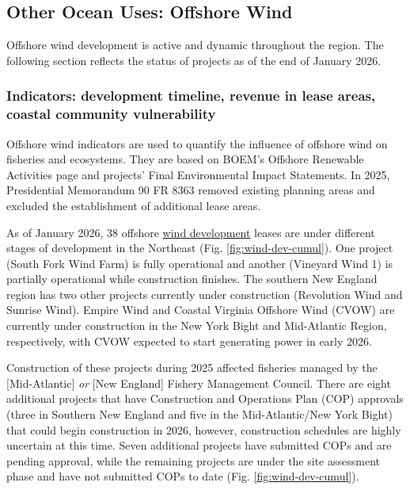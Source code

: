 \documentclass[
  10pt,
]{article}
\begin{document}
\subsection{Other Ocean Uses: Offshore Wind}\label{other-ocean-uses-offshore-wind}

Offshore wind development is active and dynamic throughout the region. The following section reflects the status of projects as of the end of January 2026.

\subsubsection{Indicators: development timeline, revenue in lease areas, coastal community vulnerability}\label{indicators-development-timeline-revenue-in-lease-areas-coastal-community-vulnerability}

Offshore wind indicators are used to quantify the influence of offshore wind on fisheries and ecosystems. They are based on BOEM's Offshore Renewable Activities page and projects' Final Environmental Impact Statements. In 2025, Presidential Memorandum 90 FR 8363 removed existing planning areas and excluded the establishment of additional lease areas.

As of January 2026, 38 offshore \href{https://noaa-edab.github.io/catalog/wind_dev_speed.html}{wind development} leases are under different stages of development in the Northeast (Fig. \ref{fig:wind-dev-cumul}). One project (South Fork Wind Farm) is fully operational and another (Vineyard Wind 1) is partially operational while construction finishes. The southern New England region has two other projects currently under construction (Revolution Wind and Sunrise Wind). Empire Wind and Coastal Virginia Offshore Wind (CVOW) are currently under construction in the New York Bight and Mid-Atlantic Region, respectively, with CVOW expected to start generating power in early 2026.

Construction of these projects during 2025 affected fisheries managed by the {[}Mid-Atlantic{]} \emph{or} {[}New England{]} Fishery Management Council. There are eight additional projects that have Construction and Operations Plan (COP) approvals (three in Southern New England and five in the Mid-Atlantic/New York Bight) that could begin construction in 2026, however, construction schedules are highly uncertain at this time. Seven additional projects have submitted COPs and are pending approval, while the remaining projects are under the site assessment phase and have not submitted COPs to date (Fig. \ref{fig:wind-dev-cumul}).
\end{document}
